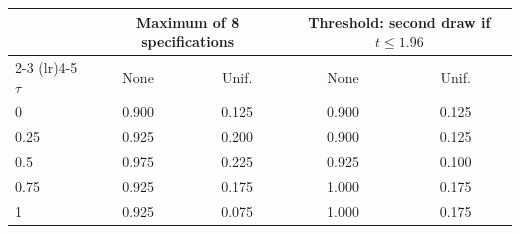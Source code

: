 \begin{tabular}{lcccc}
\toprule
 & \multicolumn{2}{c}{Maximum of 8 specifications} & \multicolumn{2}{c}{Threshold: second draw if $t \le 1.96$} \\
\cmidrule(lr){2-3} \cmidrule(lr){4-5}
$\tau$ & None & Unif. & None & Unif. \\
\midrule
0 & 0.900 & 0.125 & 0.900 & 0.125 \\
0.25 & 0.925 & 0.200 & 0.900 & 0.125 \\
0.5 & 0.975 & 0.225 & 0.925 & 0.100 \\
0.75 & 0.925 & 0.175 & 1.000 & 0.175 \\
1 & 0.925 & 0.075 & 1.000 & 0.175 \\
\bottomrule
\end{tabular}
